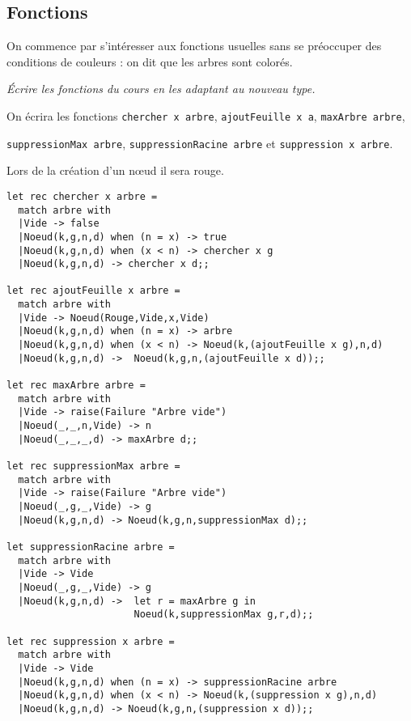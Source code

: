 \subsection{Fonctions}
On commence par s'intéresser aux fonctions usuelles sans se préoccuper des conditions de couleurs : on dit que les arbres sont colorés.
\begin{Exercise}\it 
Écrire les fonctions du cours en les adaptant au nouveau type. 

On écrira les fonctions {\tt chercher x arbre}, {\tt ajoutFeuille x a}, {\tt maxArbre arbre}, 

{\tt suppressionMax arbre}, {\tt suppressionRacine arbre} et {\tt suppression x arbre}.

Lors de la création d'un nœud il sera rouge.
\end{Exercise}
\begin{Answer} 
\begin{lstlisting}
let rec chercher x arbre = 
  match arbre with
  |Vide -> false
  |Noeud(k,g,n,d) when (n = x) -> true
  |Noeud(k,g,n,d) when (x < n) -> chercher x g
  |Noeud(k,g,n,d) -> chercher x d;;

let rec ajoutFeuille x arbre = 
  match arbre with
  |Vide -> Noeud(Rouge,Vide,x,Vide)
  |Noeud(k,g,n,d) when (n = x) -> arbre 
  |Noeud(k,g,n,d) when (x < n) -> Noeud(k,(ajoutFeuille x g),n,d)
  |Noeud(k,g,n,d) ->  Noeud(k,g,n,(ajoutFeuille x d));;

let rec maxArbre arbre = 
  match arbre with
  |Vide -> raise(Failure "Arbre vide")
  |Noeud(_,_,n,Vide) -> n
  |Noeud(_,_,_,d) -> maxArbre d;;

let rec suppressionMax arbre = 
  match arbre with
  |Vide -> raise(Failure "Arbre vide")
  |Noeud(_,g,_,Vide) -> g
  |Noeud(k,g,n,d) -> Noeud(k,g,n,suppressionMax d);;

let suppressionRacine arbre = 
  match arbre with
  |Vide -> Vide
  |Noeud(_,g,_,Vide) -> g
  |Noeud(k,g,n,d) ->  let r = maxArbre g in
                      Noeud(k,suppressionMax g,r,d);;

let rec suppression x arbre = 
  match arbre with
  |Vide -> Vide
  |Noeud(k,g,n,d) when (n = x) -> suppressionRacine arbre
  |Noeud(k,g,n,d) when (x < n) -> Noeud(k,(suppression x g),n,d)
  |Noeud(k,g,n,d) -> Noeud(k,g,n,(suppression x d));;

 \end{lstlisting}
\end{Answer}

